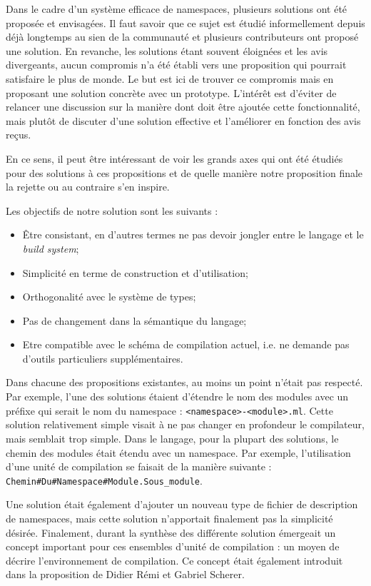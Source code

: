 \documentclass[11pt,a4paper]{report}
\begin{document}
Dans le cadre d'un système efficace de namespaces, plusieurs solutions ont été
proposée et envisagées. Il faut savoir que ce sujet est étudié informellement
depuis déjà longtemps au sien de la communauté et plusieurs contributeurs ont
proposé une solution. En revanche, les solutions étant souvent éloignées et les
avis divergeants, aucun compromis n'a été établi vers une proposition qui
pourrait satisfaire le plus de monde. Le but est ici de trouver ce compromis
mais en proposant une solution concrète avec un prototype. L'intérêt est
d'éviter de relancer une discussion sur la manière dont doit être ajoutée cette
fonctionnalité, mais plutôt de discuter d'une solution effective et l'améliorer
en fonction des avis reçus.

En ce sens, il peut être intéressant de voir les grands axes qui ont été étudiés
pour des solutions à ces propositions et de quelle manière notre proposition
finale la rejette ou au contraire s'en inspire.

Les objectifs de notre solution sont les suivants :
\begin{itemize}
\item \^{E}tre consistant, en d'autres termes ne pas devoir jongler entre le
  langage et le \emph{build system};
\item Simplicité en terme de construction et d'utilisation;
\item Orthogonalité avec le système de types;
\item Pas de changement dans la sémantique du langage;
\item Etre compatible avec le schéma de compilation actuel, i.e. ne demande
  pas d'outils particuliers supplémentaires.
\end{itemize}

Dans chacune des propositions existantes, au moins un point n'était pas
respecté. Par exemple, l'une des solutions étaient d'étendre le nom des modules
avec un préfixe qui serait le nom du namespace :
\texttt{<namespace>-<module>.ml}. Cette solution relativement simple visait à ne
pas changer en profondeur le compilateur, mais semblait trop simple. Dans le
langage, pour la plupart des solutions, le chemin des modules était étendu avec
un namespace. Par exemple, l'utilisation d'une unité de compilation se faisait
de la manière suivante :
\texttt{Chemin\#Du\#Namespace\#Module.Sous\_module}. 

Une solution était également d'ajouter un nouveau type de fichier de description
de namespaces, mais cette solution n'apportait finalement pas la simplicité
désirée. Finalement, durant la synthèse des différente solution émergeait un
concept important pour ces ensembles d'unité de compilation : un moyen de
décrire l'environnement de compilation. Ce concept était également introduit
dans la proposition de Didier Rémi et Gabriel Scherer.
\end{document}
